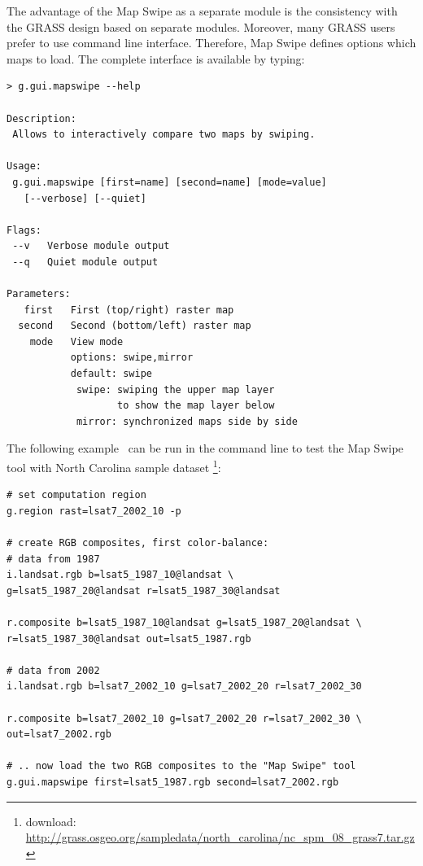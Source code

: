 \documentclass[a4paper,12pt,oneside]{book}
\newcommand{\ms}{Map Swipe\xspace}
\begin{document}
The advantage of the \ms as a separate module is the consistency with the GRASS design based on
separate modules. Moreover, many GRASS users prefer to use command line interface.
Therefore, \ms defines options which maps to load.
The complete interface is available by typing:

\begin{small}
\begin{lstlisting}[style=mybash]
> g.gui.mapswipe --help

Description:
 Allows to interactively compare two maps by swiping.

Usage:
 g.gui.mapswipe [first=name] [second=name] [mode=value] 
   [--verbose] [--quiet]

Flags:
 --v   Verbose module output
 --q   Quiet module output

Parameters:
   first   First (top/right) raster map
  second   Second (bottom/left) raster map
    mode   View mode
           options: swipe,mirror
           default: swipe
            swipe: swiping the upper map layer
                   to show the map layer below
            mirror: synchronized maps side by side

\end{lstlisting}
\end{small}

The following example~\cite{mapswipeWiki} can be run in the command line to test
the \ms tool with North Carolina sample dataset%
\footnote{download: \url{http://grass.osgeo.org/sampledata/north_carolina/nc_spm_08_grass7.tar.gz}}:
\begin{small}
\begin{lstlisting}[style=mybash]
# set computation region
g.region rast=lsat7_2002_10 -p

# create RGB composites, first color-balance:
# data from 1987
i.landsat.rgb b=lsat5_1987_10@landsat \
g=lsat5_1987_20@landsat r=lsat5_1987_30@landsat

r.composite b=lsat5_1987_10@landsat g=lsat5_1987_20@landsat \
r=lsat5_1987_30@landsat out=lsat5_1987.rgb

# data from 2002
i.landsat.rgb b=lsat7_2002_10 g=lsat7_2002_20 r=lsat7_2002_30

r.composite b=lsat7_2002_10 g=lsat7_2002_20 r=lsat7_2002_30 \
out=lsat7_2002.rgb

# .. now load the two RGB composites to the "Map Swipe" tool
g.gui.mapswipe first=lsat5_1987.rgb second=lsat7_2002.rgb
\end{lstlisting}
\end{small}
\end{document}
